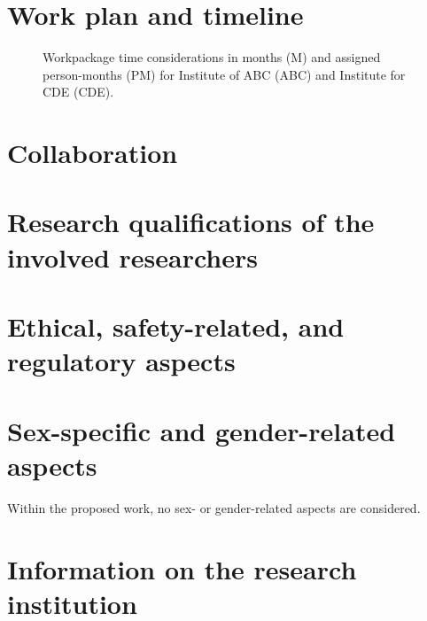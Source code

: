 \documentclass[11pt]{scrartcl}
\begin{document}
\section{Work plan and timeline}

\begin{figure}[h]
	\centering
  	\resizebox{\textwidth}{!}{}
	\caption{Workpackage time considerations in months (M) and assigned person-months (PM) for Institute of ABC (ABC) and Institute for CDE (CDE).}
	\label{fig:timeline}
\end{figure}



\section{Collaboration}



\section{Research qualifications of the involved researchers}



\section{Ethical, safety-related, and regulatory aspects}



\section{Sex-specific and gender-related aspects}

Within the proposed work, no sex- or gender-related aspects are considered.



\section{Information on the research institution}





\bigskip
\noindent{}
\end{document}
